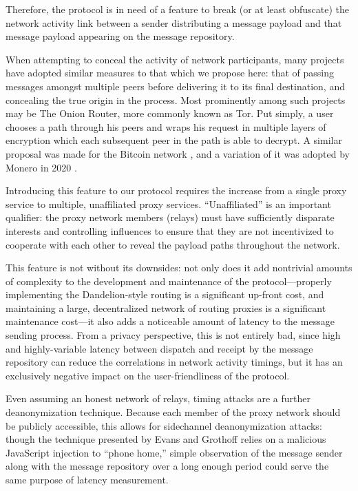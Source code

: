 Therefore, the protocol is in need of a feature to break (or at least obfuscate) the network activity link between a sender distributing a message payload and that message payload appearing on the message repository.

When attempting to conceal the activity of network participants, many projects have adopted similar measures to that which we propose here: that of passing messages amongst multiple peers before delivering it to its final destination, and concealing the true origin in the process. Most prominently among such projects may be The Onion Router, more commonly known as Tor. Put simply, a user chooses a path through his peers and wraps his request in multiple layers of encryption which each subsequent peer in the path is able to decrypt. A similar proposal was made for the Bitcoin network \parencite{venkatakrishnan_dandelion_2017}, and a variation of it \parencite{fanti_dandelion_2018} was adopted by Monero in 2020 \parencite{erciccione_blog_2020}.

Introducing this feature to our protocol requires the increase from a single proxy service to multiple, unaffiliated proxy services. ``Unaffiliated'' is an important qualifier: the proxy network members (relays) must have sufficiently disparate interests and controlling influences to ensure that they are not incentivized to cooperate with each other to reveal the payload paths throughout the network. \parencite{douceur_sybil_2002, paganini_attacks_2014}

This feature is not without its downsides: not only does it add nontrivial amounts of complexity to the development and maintenance of the protocol---properly implementing the Dandelion-style routing is a significant up-front cost, and maintaining a large, decentralized network of routing proxies is a significant maintenance cost---it also adds a noticeable amount of latency to the message sending process. From a privacy perspective, this is not entirely bad, since high and highly-variable latency between dispatch and receipt by the message repository can reduce the correlations in network activity timings, but it has an exclusively negative impact on the user-friendliness of the protocol.

Even assuming an honest network of relays, timing attacks are a further deanonymization technique. \parencite{defconconference_def_2013} Because each member of the proxy network should be publicly accessible, this allows for sidechannel deanonymization attacks: though the technique presented by Evans and Grothoff relies on a malicious JavaScript injection to ``phone home,'' simple observation of the message sender along with the message repository over a long enough period could serve the same purpose of latency measurement.

